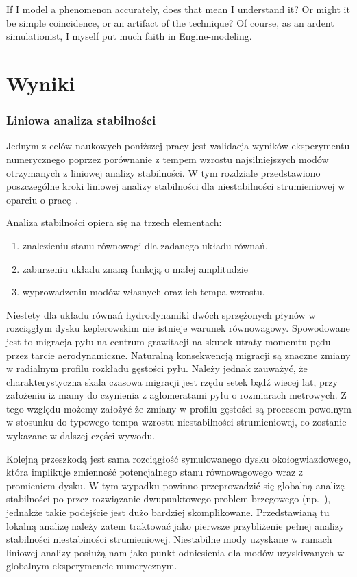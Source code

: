 \begin{savequote}[75mm]
   If I model a phenomenon accurately, does that mean I understand it? Or might it be simple coincidence, or an artifact
   of the technique? Of course, as an ardent simulationist, I myself put much faith in Engine-modeling.
\end{savequote}

\chapter{Wyniki}

\subsection{Liniowa analiza stabilności}
\label{sec:lsa}
Jednym z celów naukowych poniższej pracy jest walidacja wyników eksperymentu
numerycznego poprzez porównanie z tempem wzrostu najsilniejszych modów
otrzymanych z liniowej analizy stabilności. W tym rozdziale przedstawiono
poszczególne kroki liniowej analizy stabilności dla niestabilności strumieniowej
w oparciu o pracę~\citep{YG05}.

Analiza stabilności opiera się na trzech elementach:
\begin{enumerate}
   \item znalezieniu stanu równowagi dla zadanego układu równań,
   \item zaburzeniu układu znaną funkcją o małej amplitudzie 
   \item wyprowadzeniu modów własnych oraz ich tempa wzrostu.
\end{enumerate}
Niestety dla układu równań hydrodynamiki dwóch sprzężonych płynów w rozciągłym
dysku keplerowskim nie istnieje warunek równowagowy. Spowodowane jest to
migracja pyłu na centrum grawitacji na skutek utraty momemtu pędu przez tarcie
aerodynamiczne. Naturalną konsekwencją migracji są znaczne zmiany w radialnym
profilu rozkładu gęstości pyłu. Należy jednak zauważyć, że charakterystyczna
skala czasowa migracji jest rzędu setek bądź wiecej lat, przy założeniu iż mamy
do czynienia z aglomeratami pyłu o rozmiarach metrowych. Z tego względu możemy
założyć że zmiany w profilu gęstości są procesem powolnym w stosunku do typowego
tempa wzrostu niestabilności strumieniowej, co zostanie wykazane w dalszej
części wywodu.

Kolejną przeszkodą jest sama rozciągłość symulowanego dysku okołogwiazdowego,
która implikuje zmienność potencjalnego stanu równowagowego wraz z promieniem
dysku. W tym wypadku powinno przeprowadzić się globalną analizę stabilności po
przez rozwiązanie dwupunktowego problem brzegowego (np.~\cite{PHM04, KH06}),
jednakże takie podejście jest dużo bardziej skomplikowane. Przedstawianą tu
lokalną analizę należy zatem traktować jako pierwsze przybliżenie pełnej analizy
stabilności niestabiności strumieniowej. Niestabilne mody uzyskane w ramach
liniowej analizy posłużą nam jako punkt odniesienia dla modów uzyskiwanych w
globalnym eksperymencie numerycznym.

